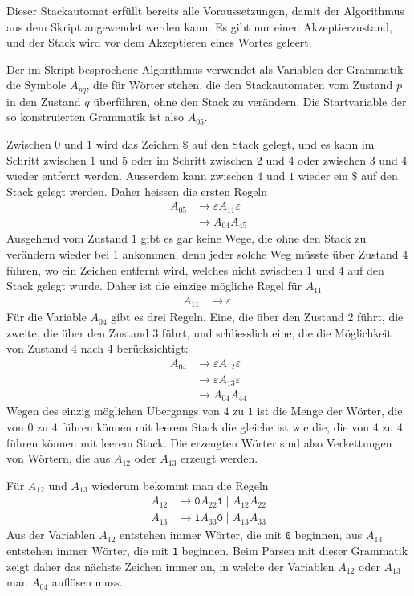 \begin{loesung}
Dieser Stackautomat erfüllt bereits alle Voraussetzungen, damit
der Algorithmus aus dem Skript angewendet werden kann. Es gibt nur
einen Akzeptierzustand, und der Stack wird vor dem Akzeptieren
eines Wortes geleert.

Der im Skript besprochene Algorithmus verwendet als Variablen der
Grammatik die Symbole $A_{pq}$, die für Wörter stehen, die den
Stackautomaten vom Zustand $p$ in den Zustand $q$ überführen, ohne
den Stack zu verändern. Die Startvariable der so konstruierten Grammatik
ist also $A_{05}$.

Zwischen $0$ und $1$ wird das Zeichen $\texttt{\$}$ auf den Stack gelegt,
und es kann im Schritt zwischen $1$ und $5$ oder im Schritt zwischen $2$
und $4$ oder zwischen $3$ und $4$ wieder entfernt werden. Ausserdem
kann zwischen $4$ und $1$ wieder ein $\texttt{\$}$ auf den Stack gelegt
werden. Daher heissen die ersten Regeln
\begin{align*}
A_{05}&\to \varepsilon A_{11}\varepsilon \\
      &\to A_{04}A_{45}
\end{align*}
Ausgehend vom Zustand $1$ gibt es gar keine Wege, die ohne den Stack zu
verändern wieder bei $1$ ankommen, denn jeder solche Weg müsste über
Zustand $4$ führen, wo ein Zeichen entfernt wird, welches nicht zwischen
$1$ und $4$ auf den Stack gelegt wurde. Daher ist die einzige mögliche
Regel für $A_{11}$
\begin{align*}
A_{11}&\to\varepsilon.
\end{align*}
Für die Variable $A_{04}$ gibt es drei Regeln. Eine, die über den
Zustand $2$ führt, die zweite, die über den Zustand $3$ führt, und
schliesslich eine, die die Möglichkeit von Zustand $4$ nach $4$ 
berücksichtigt:
\begin{align*}
A_{04}&\to \varepsilon A_{12}\varepsilon\\
      &\to \varepsilon A_{13}\varepsilon\\
      &\to A_{04}A_{44}
\end{align*}
Wegen des einzig möglichen Übergangs von $4$ zu $1$ ist die Menge der
Wörter, die von $0$ zu $4$ führen können mit leerem Stack die gleiche
ist wie die, die von $4$ zu $4$ führen können mit leerem Stack.
Die erzeugten Wörter sind also Verkettungen von Wörtern, die
aus $A_{12}$ oder $A_{13}$ erzeugt werden.

Für $A_{12}$ und $A_{13}$ wiederum bekommt man die Regeln
\begin{align*}
A_{12}&\to\texttt{0} A_{22}\texttt{1} \;|\; A_{12}A_{22}\\
A_{13}&\to\texttt{1} A_{33}\texttt{0} \;|\; A_{13}A_{33}
\end{align*}
Aus der Variablen $A_{12}$ entstehen immer Wörter, die mit \texttt{0}
beginnen, aus $A_{13}$ entstehen immer Wörter, die mit \texttt{1}
beginnen.
Beim Parsen mit dieser Grammatik zeigt daher das nächste Zeichen
immer an, in welche der Variablen $A_{12}$ oder $A_{13}$ man $A_{04}$
auflösen muss.


\end{loesung}
